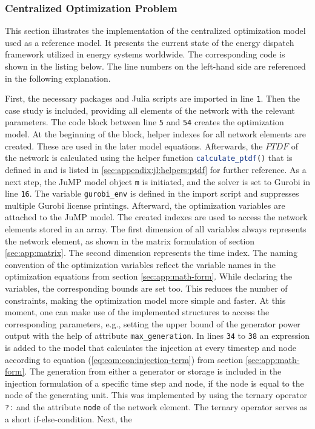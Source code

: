 \subsubsection{Centralized Optimization Problem}

This section illustrates the implementation of the centralized optimization model used as a reference model. It presents the current state of the energy dispatch framework utilized in energy systems worldwide. The corresponding code is shown in the listing below. The line numbers on the left-hand side are referenced in the following explanation.



First, the necessary packages and Julia scripts are imported in line \texttt{1}. Then the case study is included, providing all elements of the network with the relevant parameters. The code block between line \texttt{5} and \texttt{54} creates the optimization model. At the beginning of the block, helper indexes for all network elements are created. These are used in the later model equations. Afterwards, the $PTDF$ of the network is calculated using the helper function \lstinline[language=julia]{calculate_ptdf()} that is defined in  and is listed in \ref{sec:appendix:jl:helpers:ptdf} for further reference.  As a next step, the JuMP model object \lstinline[language=julia]{m} is initiated, and the solver is set to Gurobi in line \texttt{16}. The variable \lstinline[language=julia]{gurobi_env} is defined in the import script  and suppresses multiple Gurobi license printings. Afterward, the optimization variables are attached to the JuMP model. The created indexes are used to access the network elements stored in an array. The first dimension of all variables always represents the network element, as shown in the matrix formulation of section \ref{sec:app:matrix}. The second dimension represents the time index. The naming convention of the optimization variables reflect the variable names in the optimization equations from section \ref{sec:app:math-form}. While declaring the variables, the corresponding bounds are set too. This reduces the number of constraints, making the optimization model more simple and faster. At this moment, one can make use of the implemented structures to access the corresponding parameters, e.g., setting the upper bound of the generator power output with the help of attribute \lstinline[language=julia]{max_generation}. In lines \texttt{34} to \texttt{38} an expression is added to the model that calculates the injection at every timestep and node according to equation (\ref{eq:com:con:injection-term}) from section \ref{sec:app:math-form}. The generation from either a generator or storage is included in the injection formulation of a specific time step and node, if the node is equal to the node of the generating unit. This was implemented by using the ternary operator \lstinline[language=julia]{?:} and the attribute \lstinline[language=julia]{node} of the network element. The ternary operator serves as a short if-else-condition. Next, the 
